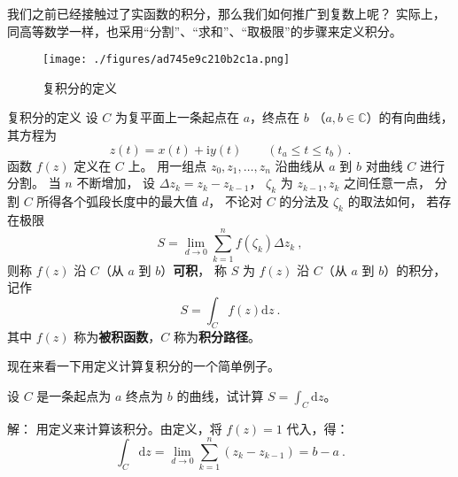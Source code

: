 
\begin{issues}
\end{issues}



我们之前已经接触过了实函数的积分，那么我们如何推广到复数上呢？ 实际上，同高等数学一样，也采用“分割”、“求和”、“取极限”的步骤来定义积分。

\begin{figure}[ht]
\centering
\texttt{[image: ./figures/ad745e9c210b2c1a.png]}
\caption{复积分的定义} \label{fig_CpxInt_1}
\end{figure}

\begin{definition}{复积分的定义}
设 $C$ 为复平面上一条起点在 $a$，终点在 $b$ （$a,b\in\mathbb C$）的有向曲线， 其方程为
\begin{equation}
z(t)=x(t)+\mathrm{i} y(t) \qquad(t_a \leqslant t \leqslant t_b)~.
\end{equation}
函数 $f(z)$ 定义在 $C$ 上。 用一组点 $z_{0}, z_{1}, \dots, z_{n}$ 沿曲线从 $a$ 到 $b$ 对曲线 $C$ 进行分割。 当 $n$ 不断增加， 设 $\Delta z_{k}=z_{k}-z_{k-1}$， $\zeta_k$ 为 $z_{k-1},z_k$ 之间任意一点， 分割 $C$ 所得各个弧段长度中的最大值 $d$， 不论对 $C$ 的分法及 $\zeta_k$ 的取法如何， 若存在极限
\begin{equation}
S = \lim_{d \rightarrow 0} \sum_{k=1}^{n} f\left(\zeta_{k}\right) \Delta z_{k}~,
\end{equation}
则称 $f(z)$ 沿 $C $（从 $a$ 到 $b$）\textbf{可积}， 称 $S$ 为 $f(z)$ 沿 $C$（从 $a$ 到 $b$）的积分，记作
\begin{equation}
S=\int_{C} f(z) \mathrm{d} z~.
\end{equation}
其中 $f (z)$ 称为\textbf{被积函数}，$C$ 称为\textbf{积分路径}。
\end{definition}

现在来看一下用定义计算复积分的一个简单例子。
\begin{example}{}
设 $C$ 是一条起点为 $a$ 终点为 $b$ 的曲线，试计算 $\displaystyle S=\int_C\mathrm dz$。

解： 用定义来计算该积分。由定义，将 $f(z)=1$ 代入，得：
\begin{equation}
\int_{C} \mathrm{d} z=\lim _{d \rightarrow 0} \sum_{k=1}^{n}\left(z_{k}-z_{k-1}\right)= b-a~.
\end{equation}
\end{example}

